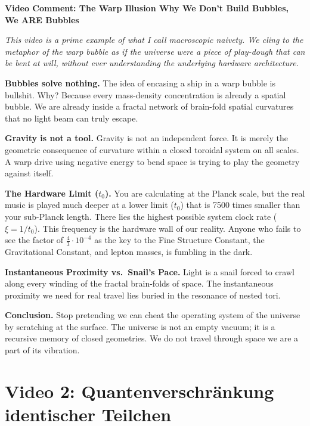 \documentclass[11pt,a4paper]{article}
\begin{document}
\begin{geminibox}
\textbf{Video Comment: The \glqq Warp Illusion\grqq{} \textendash{} Why We Don't Build Bubbles, We ARE Bubbles}

\medskip

\textit{This video is a prime example of what I call \glqq macroscopic naivety.\grqq{} We cling to the metaphor of the warp bubble as if the universe were a piece of play-dough that can be bent at will, without ever understanding the underlying hardware architecture.}

\textbf{Bubbles solve nothing.} The idea of encasing a ship in a warp bubble is bullshit. Why? Because every mass-density concentration is already a spatial bubble. We are already inside a fractal network of brain-fold spatial curvatures that no light beam can truly escape.

\textbf{Gravity is not a tool.} Gravity is not an independent force. It is merely the geometric consequence of curvature within a closed toroidal system on all scales. A warp drive using \glqq negative energy\grqq{} to bend space is trying to play the geometry against itself.

\textbf{The Hardware Limit ($t_0$).} You are calculating at the Planck scale, but the real music is played much deeper \textendash{} at a lower limit ($t_0$) that is 7500 times smaller than your sub-Planck length. There lies the highest possible system clock rate ($\xi = 1/t_0$). This frequency is the hardware wall of our reality. Anyone who fails to see the factor of $\tfrac{4}{3} \cdot 10^{-4}$ as the key to the Fine Structure Constant, the Gravitational Constant, and lepton masses, is fumbling in the dark.

\textbf{Instantaneous Proximity vs.\ Snail's Pace.} Light is a snail forced to crawl along every winding of the fractal brain-folds of space. The instantaneous proximity we need for real travel lies buried in the resonance of nested tori.

\textbf{Conclusion.} Stop pretending we can cheat the operating system of the universe by scratching at the surface. The universe is not an empty vacuum; it is a recursive memory of closed geometries. We do not travel through space \textendash{} we are a part of its vibration.
\end{geminibox}

\section{Video 2: Quantenverschr\"ankung identischer Teilchen}
\end{document}
